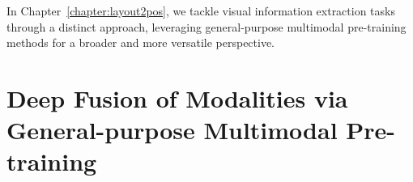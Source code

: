In Chapter~\ref{chapter:layout2pos}, we tackle visual information extraction tasks through a distinct approach, leveraging general-purpose multimodal pre-training methods for a broader and more versatile perspective.





\section{Deep Fusion of Modalities via General-purpose Multimodal Pre-training}
\label{section:related-document-understanding-deep-fusion}

